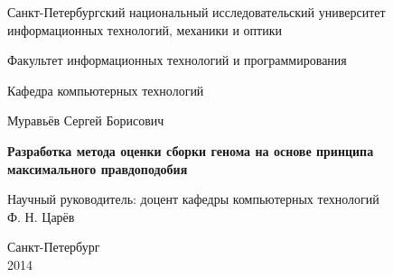 \pagestyle{title}

\begin{center}
Санкт-Петербургский национальный исследовательский университет \\ информационных технологий, механики и оптики

\vspace{2cm}

Факультет информационных технологий и программирования

Кафедра компьютерных технологий

\vspace{3cm}

{\Large Муравьёв Сергей Борисович}

\vspace{2cm}

\vbox{\LARGE\bfseries
Разработка метода оценки сборки генома на основе принципа максимального правдоподобия
}

\vspace{4cm}

{\Large Научный руководитель: доцент кафедры компьютерных технологий\\
Ф. Н. Царёв}

\vspace{6cm}

Санкт-Петербург\\ 2014
\end{center}
